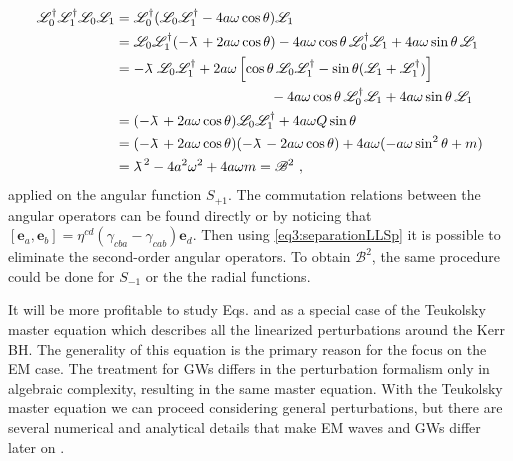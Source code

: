 \begin{align}
    \label{eq3:Bdefinition}
    \begin{split}
        \mathscr{L}^\dagger_0 \mathscr{L}^\dagger_1 \mathscr{L}_0 \mathscr{L}_1 &=
        \mathscr{L}^\dagger_0 ( \mathscr{L}_0 \mathscr{L}^\dagger_1 - 4 a\omega \cos\theta )\mathscr{L}_1 \\
        &= \mathscr{L}_0 \mathscr{L}^\dagger_1 ( - \lambdabar + 2 a\omega \cos\theta) - 4 a\omega \cos\theta \,\mathscr{L}^\dagger_0 \mathscr{L}_1 + 4 a\omega \sin\theta \,\mathscr{L}_1 \\
        &= -\lambdabar \, \mathscr{L}_0 \mathscr{L}^\dagger_1 + 2 a\omega \left[ \cos\theta \, \mathscr{L}_0 \mathscr{L}^\dagger_1 -\sin\theta(\mathscr{L}_1+\mathscr{L}^\dagger_1) \right] \\ &\mkern200mu - 4 a\omega \cos\theta \,\mathscr{L}^\dagger_0 \mathscr{L}_1 + 4 a\omega \sin\theta \,\mathscr{L}_1 \\
        &= (-\lambdabar + 2 a\omega \cos\theta ) \mathscr{L}_0 \mathscr{L}^\dagger_1 + 4 a\omega Q \sin\theta \\
        &= (-\lambdabar + 2 a\omega \cos\theta ) (-\lambdabar - 2 a\omega \cos\theta ) + 4 a\omega ( -a\omega \sin^2\theta + m ) \\
        &= \lambdabar^2 - 4 a^2 \omega^2 + 4 a \omega m = \mathscr{B}^2 ~,
    \end{split}
\end{align}
applied on the angular function $S_{+1}$.
The commutation relations between the angular operators can be found directly or by noticing that $[\bm{e}_a,\bm{e}_b]= \eta^{cd} (\gamma_{cba}-\gamma_{cab}) \bm{e}_d$.
Then using \eqref{eq3:separationLLSp} it is possible to eliminate the second-order angular operators.
To obtain $\mathscr{B}^2$, the same procedure could be done for $S_{-1}$ or the the radial functions.

It will be more profitable to study Eqs.  and  as a special case of the Teukolsky master equation \cite{Teukolsky1972} which describes all the linearized perturbations around the Kerr BH.
The generality of this equation is the primary reason for the focus on the EM case.
The treatment for GWs differs in the perturbation formalism only in algebraic complexity, resulting in the same master equation.
With the Teukolsky master equation we can proceed considering general perturbations, but there are several numerical and analytical details that make EM waves and GWs differ later on \cite{TeukolskyPress1973b}.

